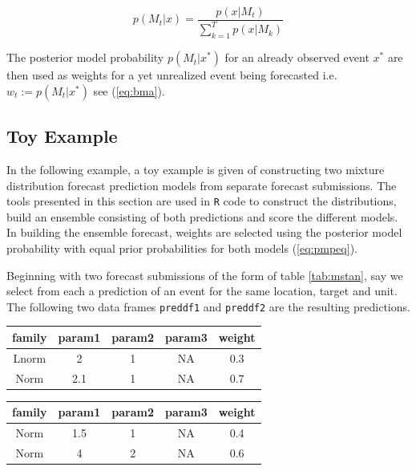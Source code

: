 \documentclass{article}\usepackage[]{graphicx}\usepackage[]{color}
\begin{document}
\begin{equation}
\label{eq:pmpeq}
p(M_t|x) =  \frac{p(x|M_t)}{\sum_{k=1}^Tp(x|M_k)}
\end{equation}

The posterior model probability $p(M_t|x^*)$ for an already observed event $x^*$
are then used as weights for a yet unrealized event being forecasted i.e.
$w_t := p(M_t|x^*)$ see (\ref{eq:bma}). 



\subsection{Toy Example}

In the following example, a toy example is given of constructing two  
mixture distribution forecast prediction models from separate forecast 
submissions. The tools presented in this section are used in \texttt{R} code to
construct the distributions, build an ensemble consisting of both predictions 
and score the different models. In building the ensemble forecast, weights are
selected using the posterior model probability with equal prior probabilities
for both models (\ref{eq:pmpeq}).

Beginning with two forecast submissions of the form of table \ref{tab:mstan}, 
say we select from each a prediction of an event for the same location, target
and unit. The following two data frames \texttt{preddf1} and \texttt{preddf2}
are the resulting predictions.

\begin{table}[h!]
\label{tab:preddf1}
\centering
 \begin{tabular}{|c|c|c|c|c|}
 \hline
    family & param1 & param2 & param3 & weight
    \\ \hline
    Lnorm & 2 & 1 & NA & 0.3  \\
    Norm & 2.1 & 1 & NA & 0.7 \\
 \hline
 \end{tabular}
\end{table}

\begin{table}[h!]
\label{tab:preddf2}
\centering
 \begin{tabular}{|c|c|c|c|c|}
 \hline
    family & param1 & param2 & param3 & weight
    \\ \hline
    Norm & 1.5 & 1 & NA & 0.4  \\
    Norm & 4 & 2 & NA & 0.6 \\
 \hline
 \end{tabular}
\end{table}
\end{document}
